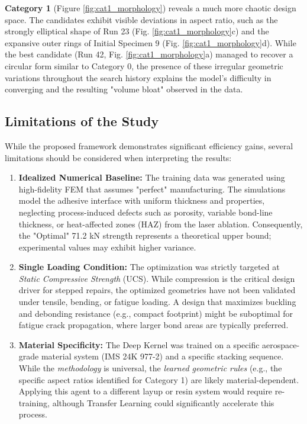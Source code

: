 \documentclass[
  preprint,
  12pt,
  a4paper
]{elsarticle}
\begin{document}
\textbf{Category 1} (Figure \ref{fig:cat1_morphology}) reveals a much more chaotic design space. The candidates exhibit visible deviations in aspect ratio, such as the strongly elliptical shape of Run 23 (Fig. \ref{fig:cat1_morphology}c) and the expansive outer rings of Initial Specimen 9 (Fig. \ref{fig:cat1_morphology}d). While the best candidate (Run 42, Fig. \ref{fig:cat1_morphology}a) managed to recover a circular form similar to Category 0, the presence of these irregular geometric variations throughout the search history explains the model's difficulty in converging and the resulting "volume bloat" observed in the data.

\subsection{Limitations of the Study}
\label{sec:limitations}

While the proposed framework demonstrates significant efficiency gains, several limitations should be considered when interpreting the results:

\begin{enumerate}
    \item \textbf{Idealized Numerical Baseline:} The training data was generated using high-fidelity FEM that assumes "perfect" manufacturing. The simulations model the adhesive interface with uniform thickness and properties, neglecting process-induced defects such as porosity, variable bond-line thickness, or heat-affected zones (HAZ) from the laser ablation. Consequently, the "Optimal" 71.2 kN strength represents a theoretical upper bound; experimental values may exhibit higher variance.
    
    \item \textbf{Single Loading Condition:} The optimization was strictly targeted at \textit{Static Compressive Strength} (UCS). While compression is the critical design driver for stepped repairs, the optimized geometries have not been validated under tensile, bending, or fatigue loading. A design that maximizes buckling and debonding resistance (e.g., compact footprint) might be suboptimal for fatigue crack propagation, where larger bond areas are typically preferred.
    
    \item \textbf{Material Specificity:} The Deep Kernel was trained on a specific aerospace-grade material system (IMS 24K 977-2) and a specific stacking sequence. While the \textit{methodology} is universal, the \textit{learned geometric rules} (e.g., the specific aspect ratios identified for Category 1) are likely material-dependent. Applying this agent to a different layup or resin system would require re-training, although Transfer Learning could significantly accelerate this process.
\end{enumerate}
\end{document}
